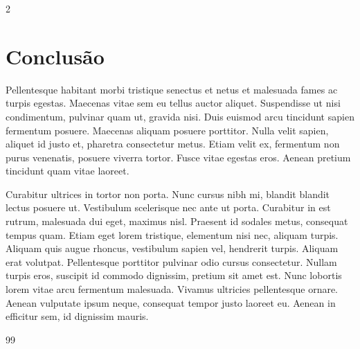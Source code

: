 \documentclass[twoside]{article}
\begin{document}
\begin{multicols}{2}
\section{Conclusão}

Pellentesque habitant morbi tristique senectus et netus et malesuada fames ac turpis egestas. Maecenas vitae sem eu tellus auctor aliquet. Suspendisse ut nisi condimentum, pulvinar quam ut, gravida nisi. Duis euismod arcu tincidunt sapien fermentum posuere. Maecenas aliquam posuere porttitor. Nulla velit sapien, aliquet id justo et, pharetra consectetur metus. Etiam velit ex, fermentum non purus venenatis, posuere viverra tortor. Fusce vitae egestas eros. Aenean pretium tincidunt quam vitae laoreet.

Curabitur ultrices in tortor non porta. Nunc cursus nibh mi, blandit blandit lectus posuere ut. Vestibulum scelerisque nec ante ut porta. Curabitur in est rutrum, malesuada dui eget, maximus nisl. Praesent id sodales metus, consequat tempus quam. Etiam eget lorem tristique, elementum nisi nec, aliquam turpis. Aliquam quis augue rhoncus, vestibulum sapien vel, hendrerit turpis. Aliquam erat volutpat. Pellentesque porttitor pulvinar odio cursus consectetur. Nullam turpis eros, suscipit id commodo dignissim, pretium sit amet est. Nunc lobortis lorem vitae arcu fermentum malesuada. Vivamus ultricies pellentesque ornare. Aenean vulputate ipsum neque, consequat tempor justo laoreet eu. Aenean in efficitur sem, id dignissim mauris.


\begin{thebibliography}{99}

\bibitem{}
 
\end{thebibliography}

\end{multicols}
\end{document}

